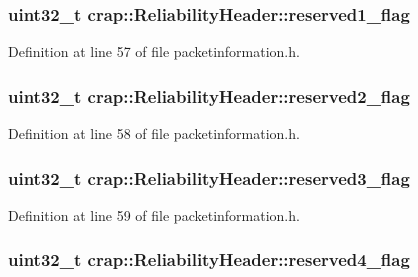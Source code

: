\subsubsection[{reserved1\+\_\+flag}]{\setlength{\rightskip}{0pt plus 5cm}uint32\+\_\+t crap\+::\+Reliability\+Header\+::reserved1\+\_\+flag}\label{structcrap_1_1_reliability_header_affcfb76dc5c78fb16f7c6ebf79477ea5}


Definition at line 57 of file packetinformation.\+h.

\hypertarget{structcrap_1_1_reliability_header_a880d879095e1f27c1cc099784c9e5e63}{}
\subsubsection[{reserved2\+\_\+flag}]{\setlength{\rightskip}{0pt plus 5cm}uint32\+\_\+t crap\+::\+Reliability\+Header\+::reserved2\+\_\+flag}\label{structcrap_1_1_reliability_header_a880d879095e1f27c1cc099784c9e5e63}


Definition at line 58 of file packetinformation.\+h.

\hypertarget{structcrap_1_1_reliability_header_a4f164e09f43d1cc64f855a364bbf2c04}{}
\subsubsection[{reserved3\+\_\+flag}]{\setlength{\rightskip}{0pt plus 5cm}uint32\+\_\+t crap\+::\+Reliability\+Header\+::reserved3\+\_\+flag}\label{structcrap_1_1_reliability_header_a4f164e09f43d1cc64f855a364bbf2c04}


Definition at line 59 of file packetinformation.\+h.

\hypertarget{structcrap_1_1_reliability_header_af2745b28df7c0fc38e84a01e244c9447}{}
\subsubsection[{reserved4\+\_\+flag}]{\setlength{\rightskip}{0pt plus 5cm}uint32\+\_\+t crap\+::\+Reliability\+Header\+::reserved4\+\_\+flag}\label{structcrap_1_1_reliability_header_af2745b28df7c0fc38e84a01e244c9447}


